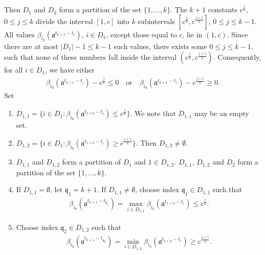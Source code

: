 \documentclass[11 pt]{amsart}
\makeatletter
\newcommand{\namedlabel}[2]{%
  \begingroup
  \def\@currentlabel{#2}%
  \label{#1}%
  \endgroup
}
\theoremstyle{definition}
\numberwithin{equation}{section}
\makeatother
\begin{document}
Then $D_1$ and $D_2$ form a partition of the set \(\{1,\dots, k\}\). The $k+1$ constants $c^{\frac{j}{k}}$, $0\leq j\leq k$ divide the interval $[1,c]$ into $k$ subintervals $[  c^{\frac{j}{k}}, c^{\frac{j+1}{k}}]$, $0\leq j\leq k-1$.
All values $\beta_{i_0}(\mathfrak{a}^{t_{k+1}-t_{i}})$, $i\in D_1$,  except those equal to $c$, lie in $(1,c)$.  Since there are at most $|D_1|-1\leq k-1$ such values, there exists some $0\leq j\leq k-1$, such that none of these numbers fall inside
 the interval $(c^{\frac{j}{k}}, c^{\frac{j+1}{k}})$. Consequently, for all $i\in D_1$, we have either
\begin{align*}
 \beta_{i_0}(\mathfrak{a}^{t_{k+1}-t_{i}})-c^{\frac{j}{k}}\leq 0\quad\text{or}\quad \beta_{i_0}(\mathfrak{a}^{t_{k+1}-t_{i}})-c^{\frac{j+1}{k}}\geq 0.
\end{align*}
Set
\begin{enumerate}
  \item [$(\mathcal{T}_4)$] $D_{1,1}=\{i\in D_1: \beta_{i_0}(\mathfrak{a}^{t_{1+k}-t_{i}})\leq c^{\frac{j}{k}}\}$. We note that $D_{1,1}$ may be an empty set.

  \smallskip
  \item[$(\mathcal{T}_5)$]  $D_{1,2}=\{i\in D_1: \beta_{i_0}(\mathfrak{a}^{t_{1+k}-t_{i}})\geq c^{\frac{j+1}{k}}\}$. Then $D_{1,2}\neq\emptyset$.

  \smallskip

  \item [$(\mathcal{T}_6)$] \namedlabel{for:246}{$\mathcal{T}_6$} $D_{1,1}$ and $D_{1,2}$ form a partition of $D_1$ and $1\in D_{1,2}$. $D_{1,1}$, $D_{1,2}$ and $D_2$ form a partition of the set $\{1,\dots, k\}$.

  \smallskip
  \item [$(\mathcal{T}_7)$]  \namedlabel{for:223}{$\mathcal{T}_7$} If $D_{1,1}=\emptyset$, let $\mathfrak{q}_1=k+1$. If $D_{1,1}\neq\emptyset$, choose index  $\mathfrak{q}_1 \in D_{1,1}$ such that
  \begin{align*}
   \beta_{i_0}(\mathfrak{a}^{t_{k+1}-t_{ \mathfrak{q}_1}})=\max_{i\in D_{1,1}} \beta_{i_0}(\mathfrak{a}^{t_{1+k}-t_{i}})\leq c^{\frac{j}{k}}.
  \end{align*}

  \item [$(\mathcal{T}_8)$] \namedlabel{for:224}{$\mathcal{T}_8$}  Choose index $\mathfrak{q}_2 \in D_{1,2}$ such that
  \begin{align*}
   \beta_{i_0}(\mathfrak{a}^{t_{k+1}-t_{ \mathfrak{q}_2}})=\min_{i\in D_{1,2}} \beta_{i_0}(\mathfrak{a}^{t_{1+k}-t_{i}})\geq c^{\frac{j+1}{k}}.
  \end{align*}

\end{enumerate}
\end{document}
